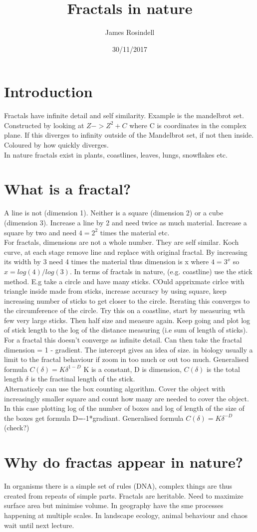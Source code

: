 \documentclass[11pt]{article}
\author{James Rosindell}
\title{Fractals in nature}
\date{30/11/2017}
\begin{document}
\maketitle
\section{Introduction}
Fractals have infinite detail and self similarity. Example is the mandelbrot set. Constructed by looking at $Z -> Z^2+C$ where C is coordinates in the complex plane. If this diverges to infinity outside of the Mandelbrot set, if not then inside. Coloured by how quickly diverges. \\
In nature fractals exist in plants, coastlines, leaves, lungs, snowflakes etc.
\section{What is a fractal?}
A line is not (dimension 1). Neither is a square (dimension 2) or a cube (dimension 3). Increase a line by 2 and need twice as much material. Increase a square by two and need $4 = 2^2$ times the material etc.\\
For fractals, dimensions are not a whole number. They are self similar. Koch curve, at each stage remove line and replace with original fractal. By increasing its width by 3 need 4 times the material thus dimension is x where $4=3^x$ so $x=log(4)/log(3)$. In terms of fractals in nature, (e.g. coastline) use the stick method. E.g take a circle and have many sticks. COuld apprixmate cirlce with triangle inside made from sticks, increase accuracy by using square, keep increasing number of sticks to get closer to the circle. Iterating this converges to the circumference of the circle. Try this on a coastline, start by measuring wth few very large sticks. Then half size and measure again. Keep going and plot log of stick length to the log of the distance measuring (i.e sum of length of sticks). For a fractal this doesn't converge as infinite detail. Can then take the fractal dimension = 1 - gradient. The intercept gives an idea of size. in biology usually a limit to the fractal behaviour if zoom in too much or out too much. Generalised formula $C(\delta) = K\delta^{1-D}$ K is a constant, D is dimension, $C(\delta)$ is the total length $\delta$ is the fractinal length of the stick.\\
Alternaticely can use the box counting algorithm. Cover the object with increasingly smaller square and count how many are needed to cover the object. In this case plotting log of the number of boxes and log of length of the size of the boxes get formula D=-1*gradiant. Generalised formula $C(\delta) = K\delta^{-D}$(check?)
\section{Why do fractas appear in nature?}
In organisms there is a simple set of rules (DNA), complex things are thus created from repeats of simple parts. Fractals are heritable. Need to maximize surface area but minimise volume. In geography have the sme processes happening at multiple scales. In landscape ecology, animal behaviour and chaos wait until next lecture.   
\end{document}

